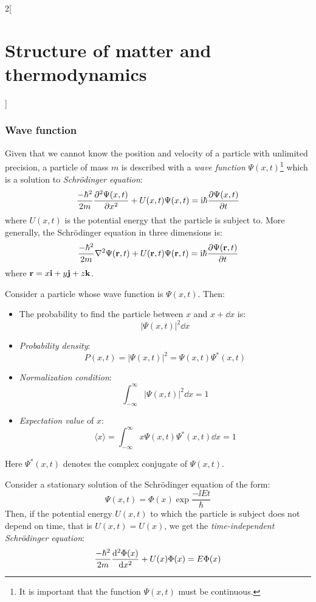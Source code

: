 \documentclass[../../../main.tex]{subfiles}
\begin{document}
\begin{multicols}{2}[\section{Structure of matter and thermodynamics}]
  \subsubsection{Wave function}
  \begin{definition}
    Given that we cannot know the position and velocity of a particle with unlimited precision, a particle of mass $m$ is described with a \emph{wave function} $\Psi(x,t)$\footnote{It is important that the function $\Psi(x,t)$ must be continuous.} which is a solution to \emph{Schrödinger equation}:
    $$\frac{-\hbar^2}{2m}\pdv[2]{\Psi(x,t)}{x}+U(x,t)\Psi(x,t)=\mathrm{i}\hbar\pdv{\Psi(x,t)}{t}$$
    where $U(x,t)$ is the potential energy that the particle is subject to. More generally, the Schrödinger equation in three dimensions is:
    $$\frac{-\hbar^2}{2m}\laplacian\Psi(\vf{r},t)+U(\vf{r},t)\Psi(\vf{r},t)=\ii\hbar\pdv{\Psi(\vf{r},t)}{t}$$ where $\boldsymbol{\mathrm{r}}=x\boldsymbol{\mathrm{i}}+y\boldsymbol{\mathrm{j}}+z\boldsymbol{\mathrm{k}}$.
  \end{definition}
  \begin{proposition}
    Consider a particle whose wave function is $\Psi(x,t)$. Then:
    \begin{itemize}
      \item The probability to find the particle between $x$ and $x+\dd{x}$ is: $$|\Psi(x,t)|^2\dd{x}$$
      \item \emph{Probability density}: $$P(x,t)=|\Psi(x,t)|^2=\Psi(x,t)\Psi^*(x,t)$$
      \item \emph{Normalization condition}: $$\int_{-\infty}^\infty|\Psi(x,t)|^2\dd{x}=1$$
      \item \emph{Expectation value} of $x$: $$\langle x\rangle=\int_{-\infty}^\infty x\Psi(x,t)\Psi^*(x,t)\dd{x}=1$$
    \end{itemize}
    Here $\Psi^*(x,t)$ denotes the complex conjugate of $\Psi(x,t)$.
  \end{proposition}
  \begin{definition}
    Consider a stationary solution of the Schrö\-din\-ger equation of the form: $$\Psi(x,t)=\Phi(x)\exp{\frac{-\ii Et}{\hbar}}$$
    Then, if the potential energy $U(x,t)$ to which the particle is subject does not depend on time, that is $U(x,t)=U(x)$, we get the \emph{time-independent Schrödinger equation}:
    \begin{equation}\label{SMT_schrodinger}
      \frac{-\hbar^2}{2m}\dv[2]{\Phi(x)}{x}+U(x)\Phi(x)=E\Phi(x)
    \end{equation}

\end{definition}
\end{multicols}
\end{document}
